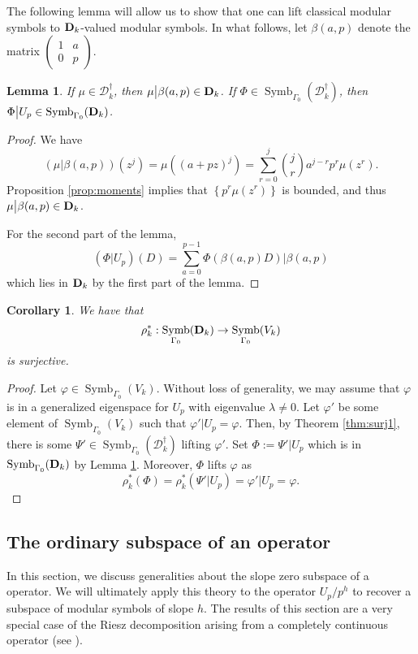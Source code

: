 \documentclass{amsart}
\theoremstyle{plain}
\newtheorem{lemma}[thm]{Lemma}
\newtheorem{cor}[thm]{Corollary}
\theoremstyle{definition}
\newcommand{\D}{{\mathcal D}}
\newcommand{\bD}{{\bf D}}
\newcommand{\maps}{\rightarrow}
\newcommand{\psmallmat}[4]{\left( \begin{smallmatrix} #1 & #2 \\ #3 & #4 \end{smallmatrix} \right)}
\newcommand{\bap}{\beta(a,p)}
\renewcommand{\binom}[2]{\genfrac{(}{)}{0pt}{}{#1}{#2}}
\renewcommand{\sp}{{\rho^*_k}}
\newcommand{\Dvrig}[1]{\bD_{#1}}
\newcommand{\Dkrig}{\Dvrig{k}}
\newcommand{\Dkoc}{\D_k^\dag}
\DeclareMathOperator{\Symb}{Symb}
\newcommand{\MSo}[1]{\Symb_{\Gamma_0}(#1)}
\begin{document}
The following lemma will allow us to show that one can lift classical modular symbols to $\Dkrig$-valued modular symbols. In what follows, let $\bap$ denote the matrix $\psmallmat{1}{a}{0}{p}$.

\begin{lemma}
\label{lemma:forceintegral} If $\mu \in \Dkoc$, then $\mu \big|
\bap \in \Dkrig$.  If $\Phi \in \MSo{\Dkoc}$, then $\Phi \big| U_p \in
\MSo{\Dkrig}$.
\end{lemma}

\begin{proof}
We have
$$
(\mu \big| \bap)(z^j) = \mu\left( (a+pz)^j \right) = \sum_{r=0}^j
\binom{j}{r} a^{j-r} p^r \mu ( z^r ).
$$
Proposition \ref{prop:moments} implies that $\left\{ p^r \mu(z^r)\right\}$ is bounded, and thus $\mu \big| \bap \in \Dkrig$.

For the second part of the lemma,
$$
(\Phi \big| U_p)(D) = \sum_{a=0}^{p-1} \Phi \left( \bap D \right)
\big | \bap
$$
which lies in $\Dkrig$ by the first part of the lemma.
\end{proof}

\begin{cor}
\label{cor:surj2} We have that
$$
\sp : \MSo{\Dkrig} \maps \MSo{V_k}
$$
is surjective.
\end{cor}

\begin{proof}
Let $\varphi \in \MSo{V_k}$.  Without loss of generality, we may
assume that $\varphi$ is in a generalized eigenspace for $U_p$ with eigenvalue
$\lambda \neq 0$.  Let $\varphi'$ be some element of $\MSo{V_k}$ such that $\varphi' | U_p = \varphi$.  Then, by Theorem \ref{thm:surj1}, there is some $\Psi'
\in \MSo{\Dkoc}$ lifting $\varphi'$.  Set $\Phi := 
\Psi' | U_p$ which is in $\MSo{\Dkrig}$ by Lemma \ref{lemma:forceintegral}.
Moreover, $\Phi$  lifts $\varphi$ as
$$
\sp(\Phi) =  \sp\left(\Psi' \big| U_p \right) =
 \varphi' \big| U_p = \varphi.
$$
\end{proof}


\subsection{The ordinary subspace of an operator}

In this section, we discuss generalities about the slope zero subspace of a operator.  We will ultimately apply this theory to the operator $U_p / p^h$ to recover a subspace of modular symbols of slope $h$.  The results of this section are a very special case of the Riesz decomposition arising from a completely continuous operator (see \cite{Serre}).  
\end{document}
